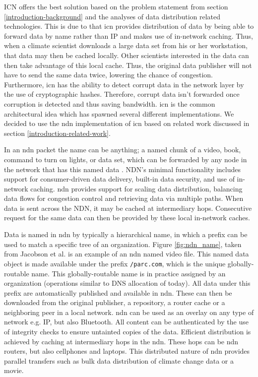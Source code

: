 ICN offers the best solution based on the problem statement from section \ref{introduction-background} and the analyses of data distribution related technologies. This is due to that \gls{icn} provides distribution of data by being able to forward data by name rather than IP and makes use of in-network caching. Thus, when a climate scientist downloads a large data set from his or her workstation, that data may then be cached locally. Other scientists interested in the data can then take advantage of this local cache. Thus, the original data publisher will not have to send the same data twice, lowering the chance of congestion. Furthermore, \gls{icn} has the ability to detect corrupt data in the network layer by the use of cryptographic hashes. Therefore, corrupt data isn't forwarded once corruption is detected and thus saving bandwidth. \gls{icn} is the common architectural idea which has spawned several different implementations. We decided to use the \gls{ndn} \cite{ndn-summary} implementation of \gls{icn} based on related work discussed in section \ref{introduction-related-work}.

\label{overview-ndn}
In an \gls{ndn} packet the name can be anything; a named chunk of a video, book, command to turn on lights, or data set, which can be forwarded by any node in the network that has this named data \cite{ndn-faq}. NDN’s minimal functionality includes support for consumer-driven data delivery, built-in data security, and use of in-network caching. \gls{ndn} provides support for scaling data distribution, balancing data flows for congestion control and retrieving data via multiple paths. When data is sent across the NDN, it may be cached at intermediary hops. Consecutive request for the same data can then be provided by these local in-network caches.

Data is named in \gls{ndn} by typically a hierarchical name, in which a prefix can be used to match a specific tree of an organization. Figure \ref{fig:ndn_name}, taken from Jacobson et al. \cite{jacobson2009networking} is an example of an \gls{ndn} named video file. This named data object is made available under the prefix \texttt{/parc.com}, which is the unique globally-routable name. This globally-routable name is in practice assigned by an organization (operations similar to DNS allocation of today). All data under this prefix are automatically published and available in \gls{ndn}. These can then be downloaded from the original publisher, a repository, a router cache or a neighboring peer in a local network. \gls{ndn} can be used as an overlay on any type of network e.g. IP, but also Bluetooth. All content can be authenticated by the use of integrity checks to ensure untainted copies of the data. Efficient distribution is achieved by caching at intermediary hops in the \gls{ndn}. These hops can be \gls{ndn} routers, but also cellphones and laptops. This distributed nature of \gls{ndn} provides parallel transfers such as bulk data distribution of climate change data or a movie.

